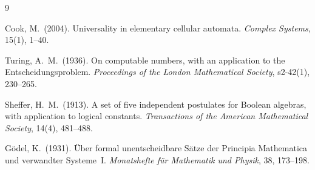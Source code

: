 \documentclass[11pt,a4paper]{article}
\begin{document}
\begin{thebibliography}{9}

Cook, M.\ (2004).
\newblock Universality in elementary cellular automata.
\newblock \textit{Complex Systems}, 15(1), 1--40.

Turing, A.\ M.\ (1936).
\newblock On computable numbers, with an application to the Entscheidungsproblem.
\newblock \textit{Proceedings of the London Mathematical Society}, s2-42(1), 230--265.

Sheffer, H.\ M.\ (1913).
\newblock A set of five independent postulates for Boolean algebras, with
  application to logical constants.
\newblock \textit{Transactions of the American Mathematical Society},
  14(4), 481--488.

Gödel, K.\ (1931).
\newblock Über formal unentscheidbare Sätze der Principia Mathematica und
  verwandter Systeme~I.
\newblock \textit{Monatshefte für Mathematik und Physik}, 38, 173--198.

\end{thebibliography}


\end{document}
